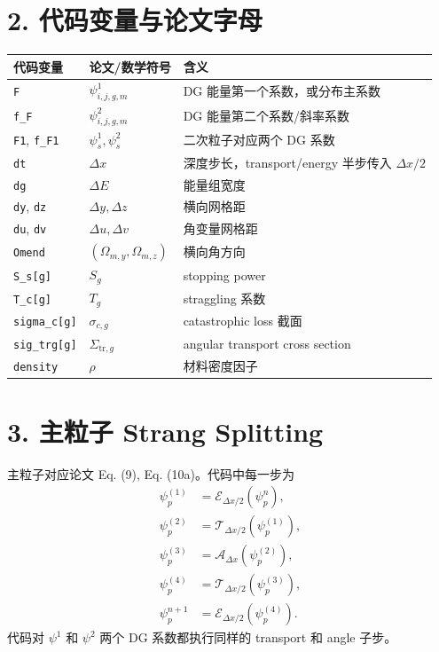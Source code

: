 \documentclass[11pt,a4paper]{ctexart}
\begin{document}
\section*{2. 代码变量与论文字母}

\begin{center}
\small
\begin{tabular}{lll}
\toprule
代码变量 & 论文/数学符号 & 含义 \\
\midrule
\texttt{F} & \(\psi^1_{i,j,g,m}\) & DG 能量第一个系数，或分布主系数 \\
\texttt{f\_F} & \(\psi^2_{i,j,g,m}\) & DG 能量第二个系数/斜率系数 \\
\texttt{F1}, \texttt{f\_F1} & \(\psi^1_{s},\psi^2_{s}\) & 二次粒子对应两个 DG 系数 \\
\texttt{dt} & \(\Delta x\) & 深度步长，transport/energy 半步传入 \(\Delta x/2\) \\
\texttt{dg} & \(\Delta E\) & 能量组宽度 \\
\texttt{dy}, \texttt{dz} & \(\Delta y,\Delta z\) & 横向网格距 \\
\texttt{du}, \texttt{dv} & \(\Delta u,\Delta v\) & 角变量网格距 \\
\texttt{Omend} & \((\Omega_{m,y},\Omega_{m,z})\) & 横向角方向 \\
\texttt{S\_s[g]} & \(S_g\) & stopping power \\
\texttt{T\_c[g]} & \(T_g\) & straggling 系数 \\
\texttt{sigma\_c[g]} & \(\sigma_{c,g}\) & catastrophic loss 截面 \\
\texttt{sig\_trg[g]} & \(\Sigma_{\mathrm{tr},g}\) & angular transport cross section \\
\texttt{density} & \(\rho\) & 材料密度因子 \\
\bottomrule
\end{tabular}
\end{center}

\section*{3. 主粒子 Strang Splitting}

主粒子对应论文 Eq. (9), Eq. (10a)。代码中每一步为
\begin{equation}
\begin{aligned}
  \psi_{p}^{(1)}
    &= \mathcal E_{\Delta x/2}(\psi_p^n),\\
  \psi_{p}^{(2)}
    &= \mathcal T_{\Delta x/2}(\psi_p^{(1)}),\\
  \psi_{p}^{(3)}
    &= \mathcal A_{\Delta x}(\psi_p^{(2)}),\\
  \psi_{p}^{(4)}
    &= \mathcal T_{\Delta x/2}(\psi_p^{(3)}),\\
  \psi_{p}^{n+1}
    &= \mathcal E_{\Delta x/2}(\psi_p^{(4)}).
\end{aligned}
\end{equation}
代码对 \(\psi^1\) 和 \(\psi^2\) 两个 DG 系数都执行同样的 transport 和 angle 子步。
\end{document}
